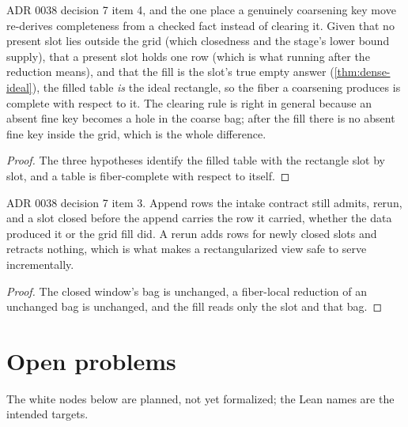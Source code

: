\begin{theorem}
  \label{thm:dense-demote-complete}
  \leanok
  ADR 0038 decision 7 item 4, and the one place a genuinely coarsening
  key move re-derives completeness from a checked fact instead of
  clearing it.  Given that no present slot lies outside the grid (which
  closedness and the stage's lower bound supply), that a present slot
  holds one row (which is what running after the reduction means), and
  that the fill is the slot's true empty answer
  (\ref{thm:dense-ideal}), the filled table \emph{is} the ideal
  rectangle, so the fiber a coarsening produces is complete with respect
  to it.  The clearing rule is right in general because an absent fine
  key becomes a hole in the coarse bag; after the fill there is no absent
  fine key inside the grid, which is the whole difference.
\end{theorem}
\begin{proof}\leanok
  The three hypotheses identify the filled table with the rectangle
  slot by slot, and a table is fiber-complete with respect to itself.
\end{proof}

\begin{theorem}
  \label{thm:dense-stable}
  \leanok
  ADR 0038 decision 7 item 3.  Append rows the intake contract still
  admits, rerun, and a slot closed before the append carries the row it
  carried, whether the data produced it or the grid fill did.  A rerun
  adds rows for newly closed slots and retracts nothing, which is what
  makes a rectangularized view safe to serve incrementally.
\end{theorem}
\begin{proof}\leanok
  The closed window's bag is unchanged, a fiber-local reduction of an
  unchanged bag is unchanged, and the fill reads only the slot and that
  bag.
\end{proof}

\chapter{Open problems}

The white nodes below are planned, not yet formalized; the Lean names
are the intended targets.

